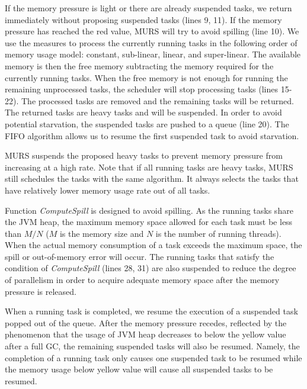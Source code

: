 If the memory pressure is light or there are already suspended tasks, we return immediately without proposing suspended tasks (lines 9, 11). If the memory pressure has reached the red value, MURS will try to avoid spilling (line 10). 
We use the measures to process the currently running tasks in the following order of memory usage model: constant, sub-linear, linear, and super-linear. The available memory is then the free memory subtracting the memory required for the currently running tasks. When the free memory is not enough for running the remaining unprocessed tasks, the scheduler will stop processing tasks (lines 15-22).
The processed tasks are removed and the remaining tasks will be returned. The returned tasks are heavy tasks and will be suspended. In order to avoid potential starvation, the suspended tasks are pushed to a queue (line 20). The FIFO algorithm allows us to resume the first suspended task to avoid starvation. 

MURS suspends the proposed heavy tasks to prevent memory pressure from increasing at a high rate. Note that if all running tasks are heavy tasks, MURS still schedules the tasks with the same algorithm. It always selects the tasks that have relatively lower memory usage rate out of all tasks. 

Function \textit{ComputeSpill} is designed to avoid spilling. As the running tasks share the JVM heap, the maximum memory space allowed for each task must be less than $M/N$ ($M$ is the memory size and $N$ is the number of running threads). When the actual memory consumption of a task exceeds the maximum space, the spill or out-of-memory error will occur. The running tasks that satisfy the condition of \textit{ComputeSpill} (lines 28, 31) are also suspended to reduce the degree of parallelism in order to acquire adequate memory space after the memory pressure is released.   

When a running task is completed, we resume the execution of a suspended task popped out of the queue. After the memory pressure recedes, reflected by the phenomenon that the usage of JVM heap decreases to below the yellow value after a full GC, the remaining suspended tasks will also be resumed. Namely, the completion of a running task only causes one suspended task to be resumed while the memory usage below yellow value will cause all suspended tasks to be resumed.

